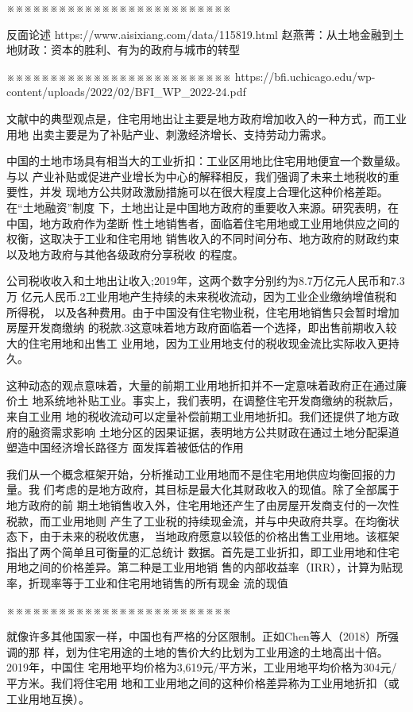 ※※※※※※※※※※※※※※※※※※※※※※※※※※


反面论述
https://www.aisixiang.com/data/115819.html
赵燕菁：从土地金融到土地财政：资本的胜利、有为的政府与城市的转型

※※※※※※※※※※※※※※※※※※※※※※※※※※
https://bfi.uchicago.edu/wp-content/uploads/2022/02/BFI_WP_2022-24.pdf

文献中的典型观点是，住宅用地出让主要是地方政府增加收入的一种方式，而工业用地
出卖主要是为了补贴产业、刺激经济增长、支持劳动力需求。

中国的土地市场具有相当大的工业折扣：工业区用地比住宅用地便宜一个数量级。与以
产业补贴或促进产业增长为中心的解释相反，我们强调了未来土地税收的重要性，并发
现地方公共财政激励措施可以在很大程度上合理化这种价格差距。在“土地融资”制度
下，土地出让是中国地方政府的重要收入来源。研究表明，在中国，地方政府作为垄断
性土地销售者，面临着住宅用地或工业用地供应之间的权衡，这取决于工业和住宅用地
销售收入的不同时间分布、地方政府的财政约束以及地方政府与其他各级政府分享税收
的程度。

公司税收收入和土地出让收入;2019年，这两个数字分别约为8.7万亿元人民币和7.3万
亿元人民币.2工业用地产生持续的未来税收流动，因为工业企业缴纳增值税和所得税，
以及各种费用。由于中国没有住宅物业税，住宅用地销售只会暂时增加房屋开发商缴纳
的税款.3这意味着地方政府面临着一个选择，即出售前期收入较大的住宅用地和出售工
业用地，因为工业用地支付的税收现金流比实际收入更持久。

这种动态的观点意味着，大量的前期工业用地折扣并不一定意味着政府正在通过廉价土
地系统地补贴工业。事实上，我们表明，在调整住宅开发商缴纳的税款后，来自工业用
地的税收流动可以定量补偿前期工业用地折扣。我们还提供了地方政府的融资需求影响
土地分区的因果证据，表明地方公共财政在通过土地分配渠道塑造中国经济增长路径方
面发挥着被低估的作用

我们从一个概念框架开始，分析推动工业用地而不是住宅用地供应均衡回报的力量。我
们考虑的是地方政府，其目标是最大化其财政收入的现值。除了全部属于地方政府的前
期土地销售收入外，住宅用地还产生了由房屋开发商支付的一次性税款，而工业用地则
产生了工业税的持续现金流，并与中央政府共享。在均衡状态下，由于未来的税收优惠，
当地政府愿意以较低的价格出售工业用地。该框架指出了两个简单且可衡量的汇总统计
数据。首先是工业折扣，即工业用地和住宅用地之间的价格差异。第二种是工业用地销
售的内部收益率（IRR），计算为贴现率，折现率等于工业和住宅用地销售的所有现金
流的现值

※※※※※※※※※※※※※※※※※※※※※※※※※※

就像许多其他国家一样，中国也有严格的分区限制。正如Chen等人（2018）所强调的那
样，划为住宅用途的土地的售价大约比划为工业用途的土地高出十倍。2019年，中国住
宅用地平均价格为3,619元/平方米，工业用地平均价格为304元/平方米。我们将住宅用
地和工业用地之间的这种价格差异称为工业用地折扣（或工业用地互换）。

